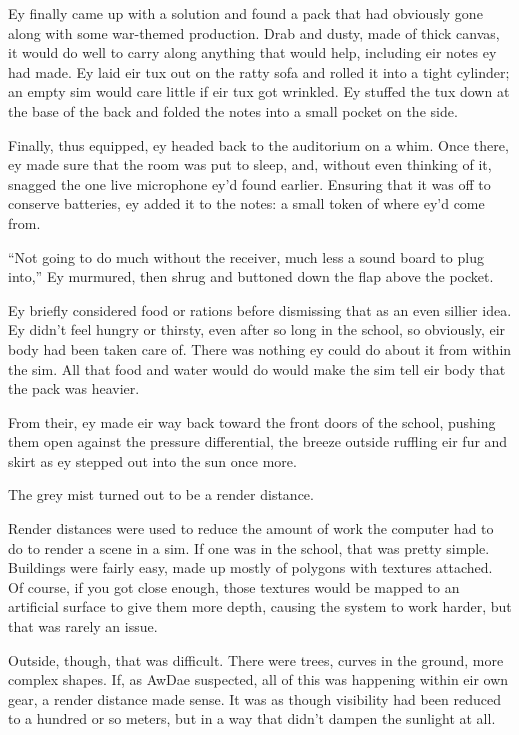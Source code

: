 Ey finally came up with a solution and found a pack that had obviously gone along with some war-themed production.  Drab and dusty, made of thick canvas, it would do well to carry along anything that would help, including eir notes ey had made.  Ey laid eir tux out on the ratty sofa and rolled it into a tight cylinder; an empty sim would care little if eir tux got wrinkled.  Ey stuffed the tux down at the base of the back and folded the notes into a small pocket on the side.

Finally, thus equipped, ey headed back to the auditorium on a whim.  Once there, ey made sure that the room was put to sleep, and, without even thinking of it, snagged the one live microphone ey'd found earlier.  Ensuring that it was off to conserve batteries, ey added it to the notes: a small token of where ey'd come from.

``Not going to do much without the receiver, much less a sound board to plug into,'' Ey murmured, then shrug and buttoned down the flap above the pocket.

Ey briefly considered food or rations before dismissing that as an even sillier idea.  Ey didn't feel hungry or thirsty, even after so long in the school, so obviously, eir body had been taken care of.  There was nothing ey could do about it from within the sim.  All that food and water would do would make the sim tell eir body that the pack was heavier.

From their, ey made eir way back toward the front doors of the school, pushing them open against the pressure differential, the breeze outside ruffling eir fur and skirt as ey stepped out into the sun once more.

\secdiv

The grey mist turned out to be a render distance.

Render distances were used to reduce the amount of work the computer had to do to render a scene in a sim.  If one was in the school, that was pretty simple.  Buildings were fairly easy, made up mostly of polygons with textures attached.  Of course, if you got close enough, those textures would be mapped to an artificial surface to give them more depth, causing the system to work harder, but that was rarely an issue.

Outside, though, that was difficult.  There were trees, curves in the ground, more complex shapes.  If, as AwDae suspected, all of this was happening within eir own gear, a render distance made sense.  It was as though visibility had been reduced to a hundred or so meters, but in a way that didn't dampen the sunlight at all.

